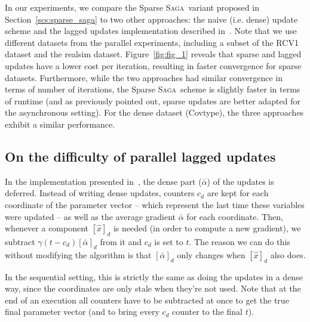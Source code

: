 \documentclass[twoside]{article}
\newcommand{\stepsize}{\gamma}
\newcommand{\SAGA}{\textsc{Saga}}
\begin{document}
In our experiments, we compare the Sparse \SAGA\ variant proposed in Section~\ref{scs:sparse_saga} to two other approaches: the naive (i.e. dense) update scheme and the lagged updates implementation described in~\citet{SAGA}.
Note that we use different datasets from the parallel experiments, including a subset of the RCV1 dataset and the realsim dataset. 
Figure~\ref{fig:fig_1} reveals that sparse and lagged updates have a lower cost per iteration, resulting in faster convergence for sparse datasets.
Furthermore, while the two approaches had similar convergence in terms of number of iterations, the Sparse \SAGA\ scheme is slightly faster in terms of runtime (and as previously pointed out, sparse updates are better adapted for the asynchronous setting).
For the dense dataset (Covtype), the three approaches exhibit a similar performance. 

\subsection{On the difficulty of parallel lagged updates} \label{apx:DifficultyLagged}

In the implementation presented in~\citet{laggedsaga}, the dense part ($\bar \alpha$) of the updates is deferred. 
Instead of writing dense updates, counters $c_d$ are kept for each coordinate of the parameter vector -- which represent the last time these variables were updated -- as well as the average gradient $\bar \alpha$ for each coordinate. 
Then, whenever a component $[\hat x]_d$ is needed (in order to compute a new gradient), we subtract $\stepsize (t-c_d) [\bar \alpha]_d$ from it and $c_d$ is set to $t$.
The reason we can do this without modifying the algorithm is that $[\bar \alpha]_d$ only changes when $[\hat x]_d$ also does.

In the sequential setting, this is strictly the same as doing the updates in a dense way, since the coordinates are only stale when they're not used. 
Note that at the end of an execution all counters have to be subtracted at once to get the true final parameter vector (and to bring every $c_d$ counter to the final $t$).
\end{document}
